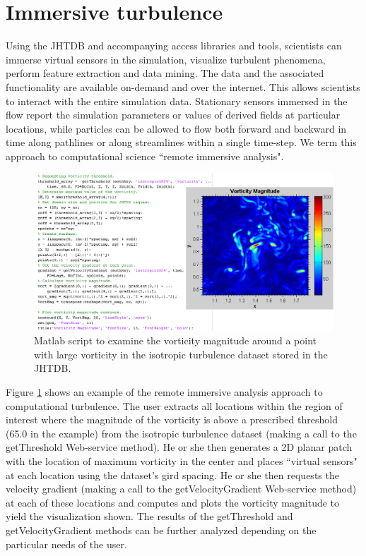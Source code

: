 \documentclass[10pt,twocolumn]{article}
\begin{document}
\section{Immersive turbulence}
Using the JHTDB and accompanying access libraries and tools, scientists can immerse virtual sensors in the simulation, visualize turbulent phenomena, 
perform feature extraction and data mining. The data and the associated functionality are available on-demand and over the internet. This allows scientists 
to interact with the entire simulation data. Stationary sensors immersed in the flow report the simulation parameters or values of derived fields at particular 
locations, while particles can be allowed to flow both forward and backward in time along pathlines or along streamlines within a single time-step. 
We term this approach to computational science ``remote immersive analysis".

\begin{figure}
\includegraphics[width=1.0\textwidth]{vorticity.png}
\caption{Matlab script to examine the vorticity magnitude around a point with large vorticity in the isotropic turbulence dataset stored in the JHTDB.}
\label{fig:vorticity}
\end{figure}

Figure \ref{fig:vorticity} shows an example of the remote immersive analysis approach to computational turbulence. The user extracts all locations within the
region of interest where the magnitude of the vorticity is above a prescribed threshold (65.0 in the example) from the isotropic turbulence dataset (making 
a call to the getThreshold Web-service method). He or she then generates a 2D planar patch with the location of maximum vorticity in the center and places
``virtual sensors" at each location using the dataset's gird spacing. He or she then requests the velocity gradient (making a call to the getVelocityGradient
Web-service method) at each of these locations and computes and plots the vorticity magnitude to yield the visualization shown. The results of the 
getThreshold and getVelocityGradient methods can be further analyzed depending on the particular needs of the user.
\end{document}
